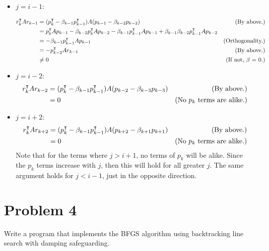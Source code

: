 \begin{solution}
\begin{itemize}
        \item \underline{$j = i-1$}:

        \tightalignbreak
        \begin{align*}
            r_k^\intercal Ar_{k-1} &= (p_k^\intercal - \beta_{k-1}p_{k-1}^\intercal)A(p_{k-1} - \beta_{k-2}p_{k-2}) &\text{(By above.)}\\
            &= p_k^\intercal Ap_{k-1} - \beta_{k-2}p_k^\intercal Ap_{k-2} - \beta_{k-1}p_{k-1}^\intercal Ap_{k-1} + \beta_{k-1}\beta_{k-2}p_{k-1}^\intercal Ap_{k-2}\\
            &= -\beta_{k-1}p_{k-1}^\intercal Ap_{k-1} &\text{(Orthogonality.)}\\
            &= -p_{k-2}^\intercal Ar_{k-1} &\text{(By above.)}\\
            &\neq 0 &\text{(If not, $\beta$ = 0.)}
        \end{align*} 
        \vspace{-12mm}\alignbreak

        \item \underline{$j = i-2$}:
        \tightalignbreak
        \begin{align*}
            r_k^\intercal Ar_{k-2} &= (p_k^\intercal - \beta_{k-1}p_{k-1}^\intercal) A(p_{k-2} - \beta_{k-3}p_{k-3}) &\text{(By above.)}\\
            &= 0 &\text{(No $p_k$ terms are alike.)}
        \end{align*}
        \vspace{-12mm}\alignbreak

        \item \underline{$j = i+2$}:
        \tightalignbreak
        \begin{align*}
            r_k^\intercal Ar_{k+2} &= (p_k^\intercal - \beta_{k-1}p_{k-1}^\intercal) A(p_{k+2} - \beta_{k+1}p_{k+1}) &\text{(By above.)}\\
            &= 0 &\text{(No $p_k$ terms are alike.)}
        \end{align*}
        \vspace{-12mm}\alignbreak
        Note that for the terms where $j > i+1$, no terms of $p_k$ will be alike. Since the $p_k$ terms increase with $j$, then this will hold for all greater $j$. The same argument holds for $j < i-1$, just in the opposite direction.

    \end{itemize}
\end{solution}
\newpage
\section{Problem 4}
Write a program that implements the BFGS algorithm using backtracking line search with damping safeguarding.

